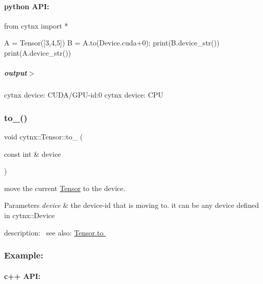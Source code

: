  \paragraph*{python A\+PI\+:}


\begin{DoxyCodeInclude}
\textcolor{keyword}{from} cytnx \textcolor{keyword}{import} *

A = Tensor([3,4,5])
B = A.to(Device.cuda+0);
print(B.device\_str())
print(A.device\_str())


\end{DoxyCodeInclude}
 \subparagraph*{output$>$}


\begin{DoxyVerbInclude}
cytnx device: CUDA/GPU-id:0
cytnx device: CPU
\end{DoxyVerbInclude}
 \mbox{\label{classcytnx_1_1Tensor_a114a31fbb8bf4a90f150b6a67e42183a}} 
\subsubsection{\texorpdfstring{to\+\_\+()}{to\_()}}
{\footnotesize\ttfamily void cytnx\+::\+Tensor\+::to\+\_\+ (\begin{DoxyParamCaption}\item[{const int \&}]{device }\end{DoxyParamCaption})\hspace{0.3cm}{\ttfamily [inline]}}



move the current \hyperlink{classcytnx_1_1Tensor}{Tensor} to the device. 


\begin{DoxyParams}{Parameters}
{\em device} & the device-\/id that is moving to. it can be any device defined in cytnx\+::\+Device\\
\hline
\end{DoxyParams}
description\+:~\newline
 see also\+: \hyperlink{classcytnx_1_1Tensor_acf7f697a9434f9bc98a7d00a555ee982}{Tensor.\+to }~\newline
 \subsubsection*{Example\+:}

\paragraph*{c++ A\+PI\+:}


